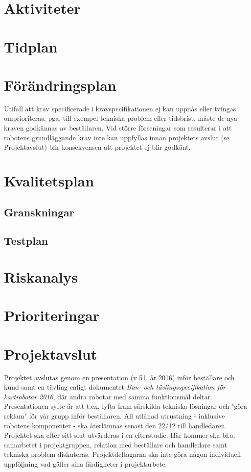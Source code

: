 \documentclass{article}
\begin{document}
\section{Aktiviteter}
\section{Tidplan}
\section{Förändringsplan}
Utifall att krav specificerade i kravspecifikationen ej kan uppnås eller tvingas omprioriteras, pga. till exempel tekniska problem eller tidsbrist, måste de nya kraven godkännas av beställaren. Vid större förseningar som resulterar i att robotens grundläggande krav inte kan uppfyllas innan projektets avslut (se Projektavslut) blir konsekvensen att projektet ej blir godkänt.  

\section{Kvalitetsplan}

\subsection{Granskningar}
\subsection{Testplan}

\section{Riskanalys}
\section{Prioriteringar}
\section{Projektavslut} 
Projektet avslutas genom en presentation (v 51, år 2016) inför beställare och kund samt en tävling enligt dokumentet \textit{Ban- och tävlingsspecifikation för kartrobotar 2016}, där andra robotar med samma funktionsmål deltar. Presentationen syfte är att t.ex. lyfta fram särskilda tekniska lösningar och "göra reklam" för vår grupp inför beställaren. All utlånad utrustning - inklusive robotens komponenter - ska återlämnas senast den 22/12 till handledaren. Projektet ska efter sitt slut utvärderas i en efterstudie. Här kommer ska bl.a. samarbetet i projektgruppen, relation med beställare och handledare samt tekniska problem diskuteras. Projektdeltagarna ska inte göra någon individuell uppföljning vad gäller sina färdigheter i projektarbete. 
\end{document}
